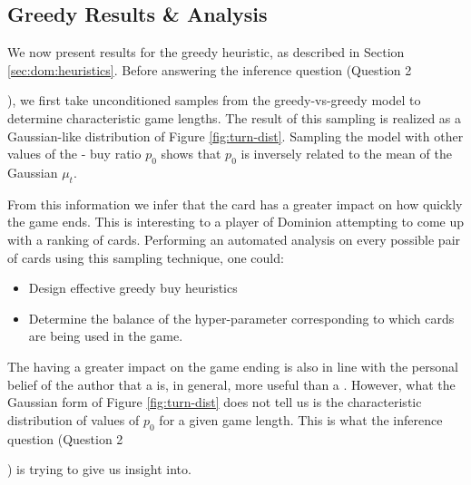 \subsection{Greedy Results \& Analysis} \label{sec:dom:greedy-results}
We now present results for the greedy heuristic, as described in
Section \ref{sec:dom:heuristics}. Before answering the inference
question (Question 2\ignore{\ref{q:inference}}), we first take unconditioned
samples from the greedy-vs-greedy model to determine characteristic
game lengths. The result of this sampling is realized as a
Gaussian-like distribution of Figure \ref{fig:turn-dist}. Sampling
the model with other values of the  - 
buy ratio $p_0$ shows that $p_0$ is inversely related to the mean
of the Gaussian $\mu_{t}$.

From this information we infer that the  card has
a greater impact on how quickly the game ends. This is interesting
to a player of Dominion attempting to come up with a ranking of
cards. Performing an automated analysis on every possible pair
of cards using this sampling technique, one could:

\begin{itemize}
\item Design effective greedy buy heuristics
\item Determine the balance of the hyper-parameter corresponding
      to which cards are being used in the game.
\end{itemize}

The  having a greater impact on the game ending is
also in line with the personal belief of the author that a
 is, in general, more useful than a .
However, what the Gaussian form of Figure \ref{fig:turn-dist}
does not tell us is the characteristic distribution of values of
$p_0$ for a given game length. This is what the inference question
(Question 2\ignore{\ref{q:inference}}) is trying to give us insight into.



